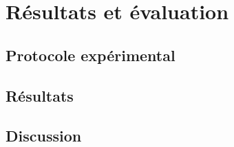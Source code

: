 \chapter{Résultats et évaluation}

\section{Protocole expérimental}

\section{Résultats}

\section{Discussion}

